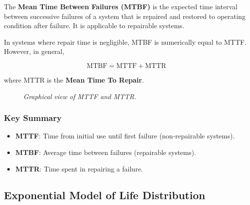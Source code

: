 \documentclass[twoside]{book}
\begin{document}
\begin{textbox}
The \textbf{Mean Time Between Failures (MTBF)} is the expected time interval between successive failures of a system that is repaired and restored to operating condition after failure. It is applicable to repairable systems.
\end{textbox}

In systems where repair time is negligible, MTBF is numerically equal to MTTF. However, in general,

\begin{textbox}
\[
\text{MTBF} = \text{MTTF} + \text{MTTR}
\]
\end{textbox}

where MTTR is the \textbf{Mean Time To Repair}.

\vspace{2mm}

\begin{figure}[H]
\begin{center}
\end{center}
\caption{\textit{Graphical view of MTTF and MTTR.}}
\end{figure}


\subsubsection{Key Summary}
\begin{itemize}
\item \textbf{MTTF}: Time from initial use until first failure (non-repairable systems).
\item \textbf{MTBF}: Average time between failures (repairable systems).
\item \textbf{MTTR}: Time spent in repairing a failure.
\end{itemize}

\subsection{Exponential Model of Life Distribution}
\end{document}
